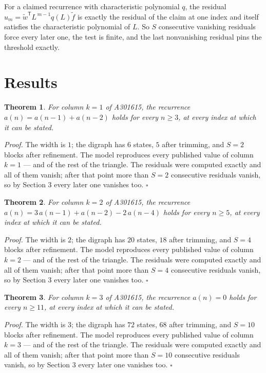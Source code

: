 \documentclass[11pt]{article}
\newtheorem{theorem}{Theorem}
\theoremstyle{definition}
\begin{document}
For a claimed recurrence with characteristic polynomial $q$, the residual $u_m = \tilde w^{\mathsf T}L^{\,m-1}q(L)\tilde f$ is exactly the residual of the claim at one index and itself satisfies the characteristic polynomial of $L$. So $S$ consecutive vanishing residuals force every later one, the test is finite, and the last nonvanishing residual pins the threshold exactly.

\section{Results}

\begin{theorem} For column $k = 1$ of A301615, the recurrence $a(n) = a(n-1) + a(n-2)$ holds for every $n \ge 3$, at every index at which it can be stated.\end{theorem}

{\itshape Proof.} The width is $1$; the digraph has $6$ states, $5$ after trimming, and $S = 2$ blocks after refinement. The model reproduces every published value of column $k = 1$ --- and of the rest of the triangle. The residuals were computed exactly and all of them vanish; after that point more than $S = 2$ consecutive residuals vanish, so by Section 3 every later one vanishes too. $\square$

\begin{theorem} For column $k = 2$ of A301615, the recurrence $a(n) = 3\,a(n-1) + a(n-2) - 2\,a(n-4)$ holds for every $n \ge 5$, at every index at which it can be stated.\end{theorem}

{\itshape Proof.} The width is $2$; the digraph has $20$ states, $18$ after trimming, and $S = 4$ blocks after refinement. The model reproduces every published value of column $k = 2$ --- and of the rest of the triangle. The residuals were computed exactly and all of them vanish; after that point more than $S = 4$ consecutive residuals vanish, so by Section 3 every later one vanishes too. $\square$

\begin{theorem} For column $k = 3$ of A301615, the recurrence $a(n) = 0$ holds for every $n \ge 11$, at every index at which it can be stated.\end{theorem}

{\itshape Proof.} The width is $3$; the digraph has $72$ states, $68$ after trimming, and $S = 10$ blocks after refinement. The model reproduces every published value of column $k = 3$ --- and of the rest of the triangle. The residuals were computed exactly and all of them vanish; after that point more than $S = 10$ consecutive residuals vanish, so by Section 3 every later one vanishes too. $\square$
\end{document}

